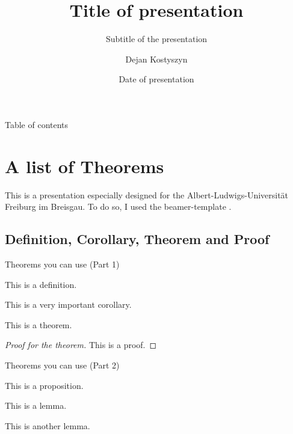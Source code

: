 %



\author[Kostyszyn]{Dejan Kostyszyn}
\date{Date of presentation}
\title{Title of presentation}
\subtitle{Subtitle of the presentation}


\begin{frame}
	\titlepage
\end{frame}


\begin{frame}{Table of contents}
\tableofcontents[sectionstyle=show/show]
\end{frame}


\section[Theorems]{A list of Theorems}
\begin{frame}
	This is a presentation especially designed for the Albert-Ludwigs-Universität Freiburg im Breisgau. To do so, I used the beamer-template \cite{ctan_beamer}.
\end{frame}


\subsection[Def., Cor., Thm., Proof]{Definition, Corollary, Theorem and Proof}
\begin{frame}{Theorems you can use (Part 1)}
	\begin{definition}[A definition]
		This is a definition.
	\end{definition}
	\begin{corollary}
		This is a \alert{very important} corollary.
	\end{corollary}
    \begin{theorem}[A theorem]
    	This is a theorem.
    \end{theorem}
    \begin{proof}[Proof for the theorem]
    	This is a proof.
    \end{proof}
\end{frame}


\begin{frame}{Theorems you can use (Part 2)}
	\begin{proposition}[A proposition]
		This is a proposition.
	\end{proposition}
	\begin{lemma}[A lemma]
		This is a lemma.
	\end{lemma}
	\begin{lemma}
		This is another lemma.
	\end{lemma}
\end{frame}


